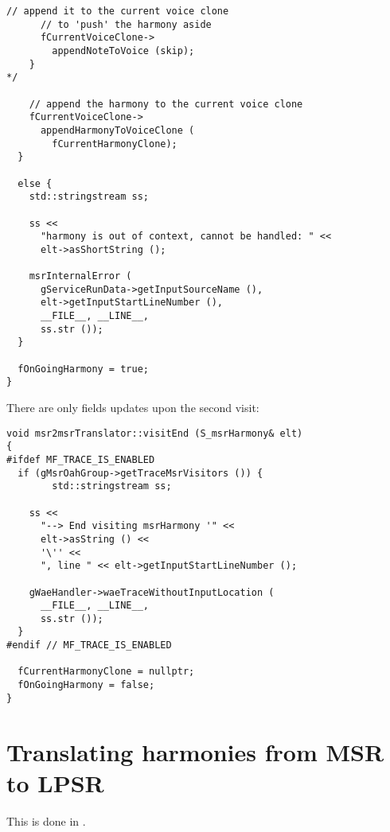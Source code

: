 \begin{lstlisting}[language=CPlusPlus]
      // append it to the current voice clone
      // to 'push' the harmony aside
      fCurrentVoiceClone->
        appendNoteToVoice (skip);
    }
*/

    // append the harmony to the current voice clone
    fCurrentVoiceClone->
      appendHarmonyToVoiceClone (
        fCurrentHarmonyClone);
  }

  else {
    std::stringstream ss;

    ss <<
      "harmony is out of context, cannot be handled: " <<
      elt->asShortString ();

    msrInternalError (
      gServiceRunData->getInputSourceName (),
      elt->getInputStartLineNumber (),
      __FILE__, __LINE__,
      ss.str ());
  }

  fOnGoingHarmony = true;
}
\end{lstlisting}

There are only fields updates upon the second visit:
\begin{lstlisting}[language=CPlusPlus]
void msr2msrTranslator::visitEnd (S_msrHarmony& elt)
{
#ifdef MF_TRACE_IS_ENABLED
  if (gMsrOahGroup->getTraceMsrVisitors ()) {
		std::stringstream ss;

    ss <<
      "--> End visiting msrHarmony '" <<
      elt->asString () <<
      '\'' <<
      ", line " << elt->getInputStartLineNumber ();

    gWaeHandler->waeTraceWithoutInputLocation (
      __FILE__, __LINE__,
      ss.str ());
  }
#endif // MF_TRACE_IS_ENABLED

  fCurrentHarmonyClone = nullptr;
  fOnGoingHarmony = false;
}
\end{lstlisting}


\section{Translating harmonies from MSR to LPSR}

This is done in \msrToLpsr{}.

